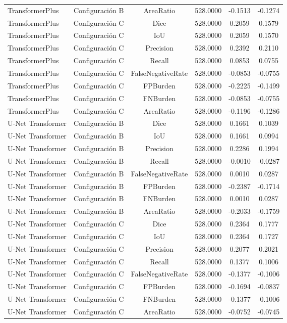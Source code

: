 \begin{table}[H]
\begin{tabular}{lccccc}
        TransformerPlus & Configuración B & AreaRatio & 528.0000 & -0.1513 & -0.1274 \\
        TransformerPlus & Configuración C & Dice & 528.0000 & 0.2059 & 0.1579 \\
        TransformerPlus & Configuración C & IoU & 528.0000 & 0.2059 & 0.1570 \\
        TransformerPlus & Configuración C & Precision & 528.0000 & 0.2392 & 0.2110 \\
        TransformerPlus & Configuración C & Recall & 528.0000 & 0.0853 & 0.0755 \\
        TransformerPlus & Configuración C & FalseNegativeRate & 528.0000 & -0.0853 & -0.0755 \\
        TransformerPlus & Configuración C & FPBurden & 528.0000 & -0.2225 & -0.1499 \\
        TransformerPlus & Configuración C & FNBurden & 528.0000 & -0.0853 & -0.0755 \\
        TransformerPlus & Configuración C & AreaRatio & 528.0000 & -0.1196 & -0.1286 \\
        U-Net Transformer & Configuración B & Dice & 528.0000 & 0.1661 & 0.1039 \\
        U-Net Transformer & Configuración B & IoU & 528.0000 & 0.1661 & 0.0994 \\
        U-Net Transformer & Configuración B & Precision & 528.0000 & 0.2286 & 0.1994 \\
        U-Net Transformer & Configuración B & Recall & 528.0000 & -0.0010 & -0.0287 \\
        U-Net Transformer & Configuración B & FalseNegativeRate & 528.0000 & 0.0010 & 0.0287 \\
        U-Net Transformer & Configuración B & FPBurden & 528.0000 & -0.2387 & -0.1714 \\
        U-Net Transformer & Configuración B & FNBurden & 528.0000 & 0.0010 & 0.0287 \\
        U-Net Transformer & Configuración B & AreaRatio & 528.0000 & -0.2033 & -0.1759 \\
        U-Net Transformer & Configuración C & Dice & 528.0000 & 0.2364 & 0.1777 \\
        U-Net Transformer & Configuración C & IoU & 528.0000 & 0.2364 & 0.1727 \\
        U-Net Transformer & Configuración C & Precision & 528.0000 & 0.2077 & 0.2021 \\
        U-Net Transformer & Configuración C & Recall & 528.0000 & 0.1377 & 0.1006 \\
        U-Net Transformer & Configuración C & FalseNegativeRate & 528.0000 & -0.1377 & -0.1006 \\
        U-Net Transformer & Configuración C & FPBurden & 528.0000 & -0.1694 & -0.0837 \\
        U-Net Transformer & Configuración C & FNBurden & 528.0000 & -0.1377 & -0.1006 \\
        U-Net Transformer & Configuración C & AreaRatio & 528.0000 & -0.0752 & -0.0745 \\
        \bottomrule
    \end{tabular}
\end{table}
